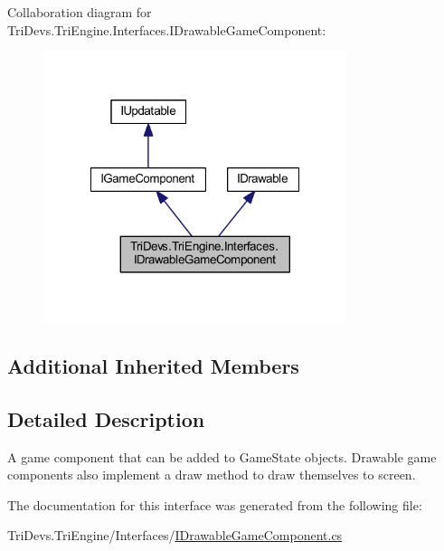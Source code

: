 Collaboration diagram for Tri\-Devs.\-Tri\-Engine.\-Interfaces.\-I\-Drawable\-Game\-Component\-:
\nopagebreak
\begin{figure}[H]
\begin{center}
\leavevmode
\includegraphics[width=251pt]{interface_tri_devs_1_1_tri_engine_1_1_interfaces_1_1_i_drawable_game_component__coll__graph}
\end{center}
\end{figure}
\subsection*{Additional Inherited Members}


\subsection{Detailed Description}
A game component that can be added to Game\-State objects. Drawable game components also implement a draw method to draw themselves to screen. 



The documentation for this interface was generated from the following file\-:\begin{DoxyCompactItemize}
\item 
Tri\-Devs.\-Tri\-Engine/\-Interfaces/\hyperlink{_i_drawable_game_component_8cs}{I\-Drawable\-Game\-Component.\-cs}\end{DoxyCompactItemize}
